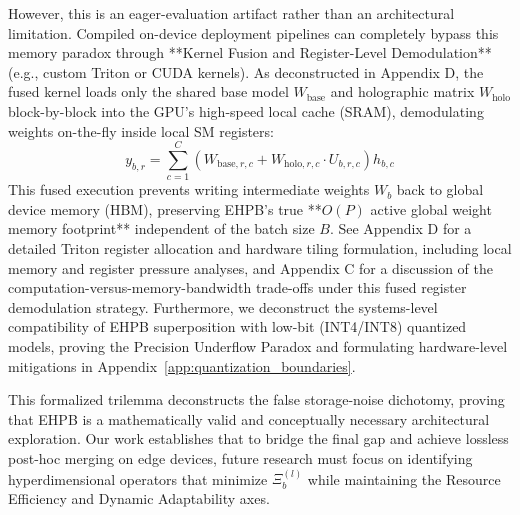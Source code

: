 However, this is an eager-evaluation artifact rather than an architectural limitation. Compiled on-device deployment pipelines can completely bypass this memory paradox through **Kernel Fusion and Register-Level Demodulation** (e.g., custom Triton or CUDA kernels). As deconstructed in Appendix D, the fused kernel loads only the shared base model $W_{\text{base}}$ and holographic matrix $W_{\text{holo}}$ block-by-block into the GPU's high-speed local cache (SRAM), demodulating weights on-the-fly inside local SM registers:
\begin{equation}
y_{b, r} = \sum_{c=1}^C \left( W_{\text{base}, r, c} + W_{\text{holo}, r, c} \cdot U_{b, r, c} \right) h_{b, c}
\end{equation}
This fused execution prevents writing intermediate weights $W_b$ back to global device memory (HBM), preserving EHPB's true **$O(P)$ active global weight memory footprint** independent of the batch size $B$. See Appendix D for a detailed Triton register allocation and hardware tiling formulation, including local memory and register pressure analyses, and Appendix C for a discussion of the computation-versus-memory-bandwidth trade-offs under this fused register demodulation strategy. Furthermore, we deconstruct the systems-level compatibility of EHPB superposition with low-bit (INT4/INT8) quantized models, proving the Precision Underflow Paradox and formulating hardware-level mitigations in Appendix~\ref{app:quantization_boundaries}.

This formalized trilemma deconstructs the false storage-noise dichotomy, proving that EHPB is a mathematically valid and conceptually necessary architectural exploration. Our work establishes that to bridge the final gap and achieve lossless post-hoc merging on edge devices, future research must focus on identifying hyperdimensional operators that minimize $\Xi_b^{(l)}$ while maintaining the Resource Efficiency and Dynamic Adaptability axes.


